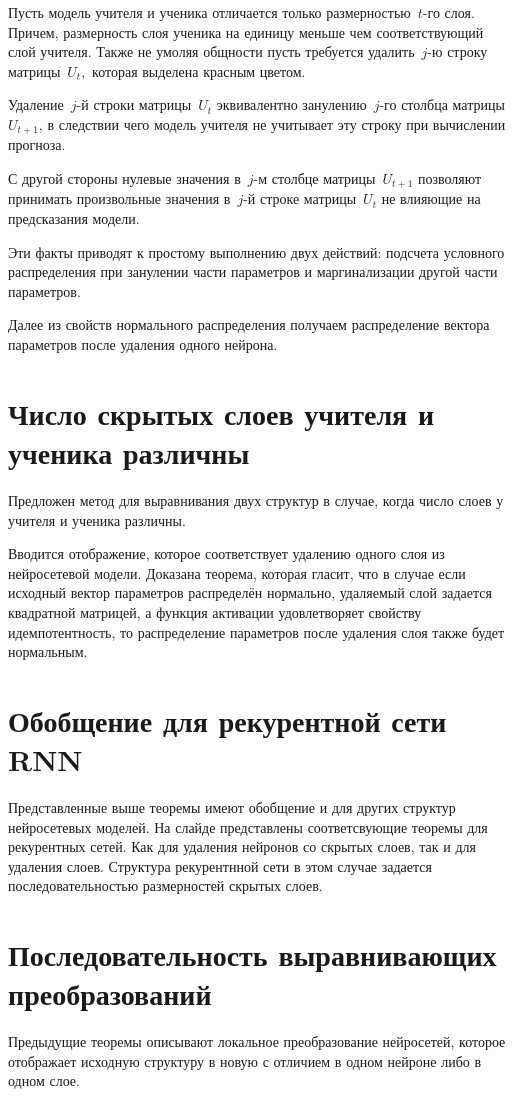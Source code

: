 \documentclass[10pt, twoside]{article}
\begin{document}
Пусть модель учителя и ученика отличается только размерностью~$t$-го слоя. Причем, размерность слоя ученика на единицу меньше чем соответствующий слой учителя. Также не умоляя общности пусть требуется удалить~$j$-ю строку матрицы~$U_t,$ которая выделена красным цветом.

Удаление~$j$-й строки матрицы~$U_t$ эквивалентно занулению~$j$-го столбца матрицы~$U_{t+1}$, в следствии чего модель учителя не учитывает эту строку при вычислении прогноза.

С другой стороны нулевые значения в~$j$-м столбце матрицы~$U_{t+1}$ позволяют принимать произвольные значения в~$j$-й строке матрицы~$U_{t}$ не влияющие на предсказания модели.

Эти факты приводят к простому выполнению двух действий: подсчета условного распределения при занулении части параметров и маргинализации другой части параметров.

Далее из свойств нормального распределения получаем распределение вектора параметров после удаления одного нейрона.

\section{Число скрытых слоев учителя и ученика различны}
Предложен метод для выравнивания двух структур в случае, когда число слоев у учителя и ученика различны.

Вводится отображение, которое соответствует удалению одного слоя из нейросетевой модели.
Доказана теорема, которая гласит, что в случае если исходный вектор параметров распределён нормально, удаляемый слой задается квадратной матрицей, а функция активации удовлетворяет свойству идемпотентность, то распределение параметров после удаления слоя также будет нормальным.

\section{Обобщение для рекурентной сети RNN}
Представленные выше теоремы имеют обобщение и для других структур нейросетевых моделей. На слайде представлены соответсвующие теоремы для рекурентных сетей. Как для удаления нейронов со скрытых слоев, так и для удаления слоев. Структура рекурентнной сети в этом случае задается последовательностью размерностей скрытых слоев.

\section{Последовательность выравнивающих преобразований}
Предыдущие теоремы описывают локальное преобразование нейросетей, которое отображает исходную структуру в новую с отличием в одном нейроне либо в одном слое.
\end{document}
